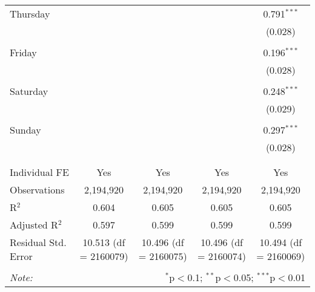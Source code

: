 \documentclass[
]{article}
\begin{document}
\begin{table}[!htbp]
{\begin{tabular}{@{\extracolsep{5pt}}lcccc}
 Thursday &  &  &  & 0.791$^{***}$ \\ 
  &  &  &  & (0.028) \\ 
  & & & & \\ 
 Friday &  &  &  & 0.196$^{***}$ \\ 
  &  &  &  & (0.028) \\ 
  & & & & \\ 
 Saturday &  &  &  & 0.248$^{***}$ \\ 
  &  &  &  & (0.029) \\ 
  & & & & \\ 
 Sunday &  &  &  & 0.297$^{***}$ \\ 
  &  &  &  & (0.028) \\ 
  & & & & \\ 
\hline \\[-1.8ex] 
Individual FE & Yes & Yes & Yes & Yes \\ 
Observations & 2,194,920 & 2,194,920 & 2,194,920 & 2,194,920 \\ 
R$^{2}$ & 0.604 & 0.605 & 0.605 & 0.605 \\ 
Adjusted R$^{2}$ & 0.597 & 0.599 & 0.599 & 0.599 \\ 
Residual Std. Error & 10.513 (df = 2160079) & 10.496 (df = 2160075) & 10.496 (df = 2160074) & 10.494 (df = 2160069) \\ 
\hline 
\hline \\[-1.8ex] 
\textit{Note:}  & \multicolumn{4}{r}{$^{*}$p$<$0.1; $^{**}$p$<$0.05; $^{***}$p$<$0.01} \\ 
\end{tabular}
} 
\end{table} 
\newpage
\end{document}
